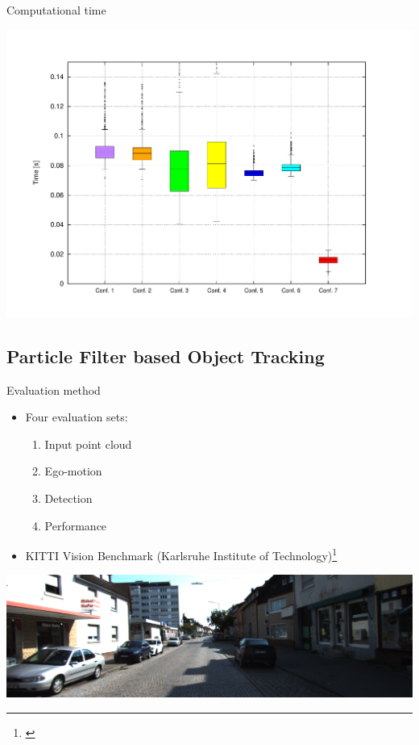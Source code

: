 \begin{frame}{Computational time}
  \begin{center}
    \includegraphics[width=\textwidth,trim=50 40 80 60,clip]{times_average}
  \end{center}
\end{frame}

\subsection{Particle Filter based Object Tracking}

\begin{frame}{Evaluation method}
  \begin{itemize}
   \item Four evaluation sets:
   \begin{enumerate}
    \item Input point cloud
    \item Ego-motion
    \item Detection
    \item Performance
   \end{enumerate}
   \item KITTI Vision Benchmark (Karlsruhe Institute of Technology)\footnote{\cite{geiger2013vision}}
  \end{itemize}
  \begin{center}
    \includegraphics[width=\textwidth]{kitti}
  \end{center}
\end{frame}


